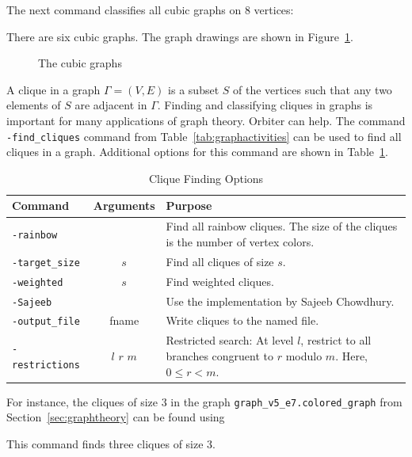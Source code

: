 \bigskip

The next command classifies all cubic graphs on 8 vertices:
{\tt

}
There are six cubic graphs. 
The graph drawings are shown in Figure~\ref{fig:graph:drawings:cubic:8}.
\begin{figure}






\caption{\label{fig:graph:drawings:cubic:8}The cubic graphs}
\end{figure}



A clique in a graph $\Gamma = (V,E)$ is a subset $S$ of the vertices 
such that any two elements of $S$ are adjacent in $\Gamma.$
Finding and classifying cliques in graphs is important for many applications of graph theory. 
Orbiter can help. 
The command \verb'-find_cliques' command from 
Table~\ref{tab:graphactivities} can be used to find all cliques in a graph.
Additional options for this command are shown in 
Table~\ref{tab:graphcliques}.
\begin{table}
\begin{center}
\begin{tabular}{|p{4cm}|c|p{7cm}|}
\hline
Command & Arguments & Purpose \\
\hline
\hline
\verb'-rainbow' &  & Find all rainbow cliques. The size of the cliques is the number of vertex colors. \\
\hline
\verb'-target_size' & $s$  & Find all cliques of size $s$. \\
\hline
\verb'-weighted' & $s$  & Find weighted cliques. \\
\hline
\verb'-Sajeeb' &   & Use the implementation by Sajeeb Chowdhury. \\
\hline
\verb'-output_file' &  fname & Write cliques to the named file. \\
\hline
\verb'-restrictions' &  $l$ $r$  $m$ & Restricted search: At level $l$, restrict to all branches congruent to $r$ modulo $m$. Here, $0 \le r < m.$ \\
\hline
\end{tabular}
\end{center}
\caption{\label{tab:graphcliques}Clique Finding Options}
\end{table}
For instance, the cliques of size 3 in the graph \verb'graph_v5_e7.colored_graph' from Section~\ref{sec:graphtheory} can be found using
{\tt

}
This command finds three cliques of size 3.

